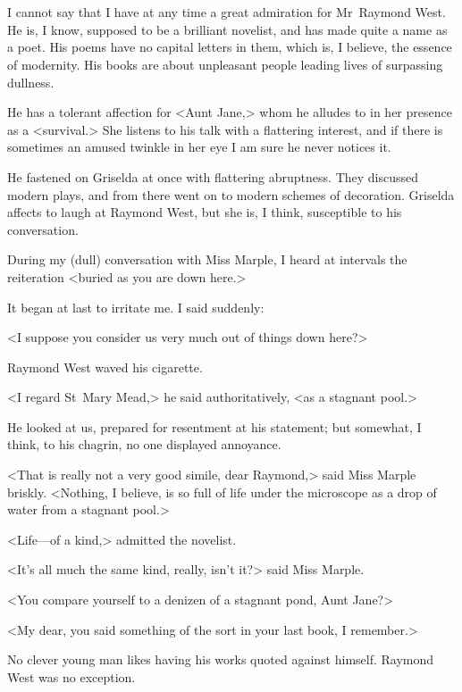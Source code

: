 \chapter[Chapter  \thechapter]{}


\lettrine{I}{} cannot say that I have at any time a great admiration for Mr~Raymond West. He is, I know, supposed to be a brilliant novelist, and has made quite a name as a poet. His poems have no capital letters in them, which is, I believe, the essence of modernity. His books are about unpleasant people leading lives of surpassing dullness.

He has a tolerant affection for <Aunt Jane,> whom he alludes to in her presence as a <survival.> She listens to his talk with a flattering interest, and if there is sometimes an amused twinkle in her eye I am sure he never notices it.

He fastened on Griselda at once with flattering abruptness. They discussed modern plays, and from there went on to modern schemes of decoration. Griselda affects to laugh at Raymond West, but she is, I think, susceptible to his conversation.

During my (dull) conversation with Miss Marple, I heard at intervals the reiteration <buried as you are down here.>

It began at last to irritate me. I said suddenly:

<I suppose you consider us very much out of things down here?>

Raymond West waved his cigarette.

<I regard St~Mary Mead,> he said authoritatively, <as a stagnant pool.>

He looked at us, prepared for resentment at his statement; but somewhat, I think, to his chagrin, no one displayed annoyance.

<That is really not a very good simile, dear Raymond,> said Miss Marple briskly. <Nothing, I believe, is so full of life under the microscope as a drop of water from a stagnant pool.>

<Life—of a kind,> admitted the novelist.

<It's all much the same kind, really, isn't it?> said Miss Marple.

<You compare yourself to a denizen of a stagnant pond, Aunt Jane?>

<My dear, you said something of the sort in your last book, I remember.>

No clever young man likes having his works quoted against himself. Raymond West was no exception.


